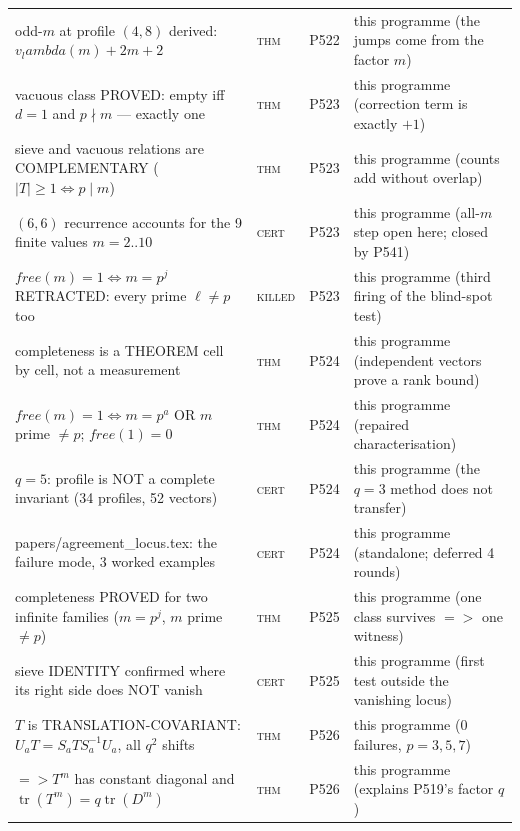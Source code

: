 \documentclass[12pt,a4paper]{article}
\def\mathrm#1{#1}%
\def\textbf#1{#1}%
\def\texttt#1{#1}%
\def\lambda{lambda}%
\def\Rightarrow{ => }%
\theoremstyle{definition}
\begin{document}
\begin{center}
\begin{tabular}{@{}p{}llp{}@{}}
odd-$m$ at profile $(4,8)$ derived: $v_\lambda(m){+}2m{+}2$ & \textsc{thm} & P522 & this programme (the jumps come from the factor $m$) \\
vacuous class PROVED: empty iff $d{=}1$ and $p\nmid m$ --- exactly one & \textsc{thm} & P523 & this programme (correction term is exactly $+1$) \\
sieve and vacuous relations are COMPLEMENTARY ($\lvert T\rvert{\ge}1\iff p\mid m$) & \textsc{thm} & P523 & this programme (counts add without overlap) \\
$(6,6)$ recurrence accounts for the 9 finite values $m{=}2..10$ & \textsc{cert} & P523 & this programme (all-$m$ step open here; closed by P541) \\
\textbf{$\mathrm{free}(m){=}1\iff m{=}p^j$ RETRACTED}: every prime $\ell\neq p$ too & \textsc{killed} & P523 & this programme (third firing of the blind-spot test) \\
completeness is a THEOREM cell by cell, not a measurement & \textsc{thm} & P524 & this programme (independent vectors prove a rank bound) \\
$\mathrm{free}(m){=}1\iff m{=}p^a$ OR $m$ prime $\neq p$; $\mathrm{free}(1){=}0$ & \textsc{thm} & P524 & this programme (repaired characterisation) \\
$q{=}5$: profile is NOT a complete invariant (34 profiles, 52 vectors) & \textsc{cert} & P524 & this programme (the $q{=}3$ method does not transfer) \\
\texttt{papers/agreement\_locus.tex}: the failure mode, 3 worked examples & \textsc{cert} & P524 & this programme (standalone; deferred 4 rounds) \\
completeness PROVED for two infinite families ($m{=}p^j$, $m$ prime $\neq p$) & \textsc{thm} & P525 & this programme (one class survives $\Rightarrow$ one witness) \\
sieve IDENTITY confirmed where its right side does NOT vanish & \textsc{cert} & P525 & this programme (first test outside the vanishing locus) \\
$T$ is TRANSLATION-COVARIANT: $U_aT=S_aTS_a^{-1}U_a$, all $q^2$ shifts & \textsc{thm} & P526 & this programme (0 failures, $p{=}3,5,7$) \\
$\Rightarrow T^m$ has constant diagonal and $\operatorname{tr}(T^m)=q\operatorname{tr}(D^m)$ & \textsc{thm} & P526 & this programme (explains P519's factor $q$) \\
\bottomrule
\end{tabular}
\end{center}
\end{document}

